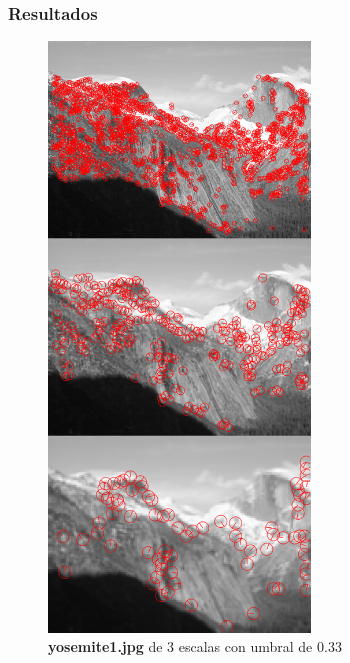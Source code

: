 \documentclass{article}
\begin{document}
\subsubsection{Resultados}

\begin{figure}[hbt!]
	\centering
	\includegraphics[width=0.62\textwidth]{../assets/Ejercicio1-Escala.png}
	\caption{\textbf{yosemite1.jpg} de 3 escalas con umbral de 0.33}
\end{figure}

\newpage
\end{document}
